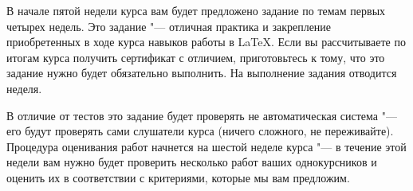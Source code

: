 \documentclass[a4paper]{article}
\begin{document}
В начале пятой недели курса вам будет предложено задание по темам первых четырех недель. Это задание "--- отличная практика и закрепление приобретенных в ходе курса навыков работы в \LaTeX. Если вы рассчитываете по итогам курса получить сертификат с отличием, приготовьтесь к тому, что это задание нужно будет обязательно выполнить. На выполнение задания отводится неделя.

В отличие от тестов это задание будет проверять не автоматическая система "--- его будут проверять сами слушатели курса (ничего сложного, не переживайте). Процедура оценивания работ начнется на шестой неделе курса "--- в течение этой недели вам нужно будет проверить несколько работ ваших однокурсников и оценить их в соответствии с критериями, которые мы вам предложим.
\end{document}
